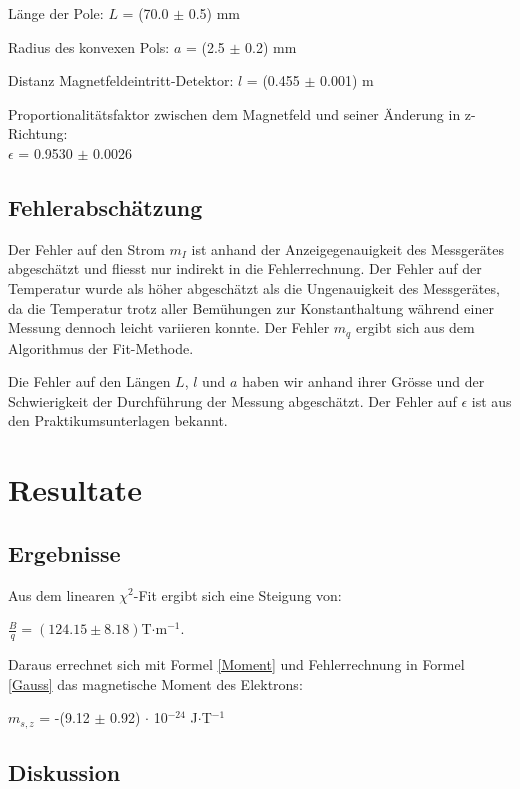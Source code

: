 \documentclass[a4paper,parskip,11pt, DIV12]{scrreprt}
\begin{document}
Länge der Pole:
$L$ = (70.0 $\pm$ 0.5) mm

Radius des konvexen Pols:
$a$ = (2.5 $\pm$ 0.2) mm

Distanz Magnetfeldeintritt-Detektor:
$l$ = (0.455 $\pm$ 0.001) m

Proportionalitätsfaktor zwischen dem Magnetfeld und seiner Änderung in z-Richtung:\\
$\epsilon$ = 0.9530 $\pm$ 0.0026


\section{Fehlerabschätzung}
Der Fehler auf den Strom $m_I$ ist anhand der Anzeigegenauigkeit des Messgerätes abgeschätzt und fliesst nur indirekt in die Fehlerrechnung. Der Fehler auf der Temperatur wurde als höher abgeschätzt als die Ungenauigkeit des Messgerätes, da die Temperatur trotz aller Bemühungen zur Konstanthaltung während einer Messung dennoch leicht variieren konnte. Der Fehler $m_q$ ergibt sich aus dem Algorithmus der Fit-Methode.

Die Fehler auf den Längen $L$, $l$ und $a$ haben wir anhand ihrer Grösse und der Schwierigkeit der Durchführung der Messung abgeschätzt. Der Fehler auf $\epsilon$ ist aus den Praktikumsunterlagen bekannt.
\clearpage

\chapter{Resultate}

\section{Ergebnisse}

Aus dem linearen $\chi^2$-Fit ergibt sich eine Steigung von:

$\frac{B}{q} = (124.15 \pm 8.18) $T$ \cdot $m$^{-1}$.

Daraus errechnet sich mit Formel \ref{Moment} und Fehlerrechnung in Formel \ref{Gauss} das magnetische Moment des Elektrons:
\begin{center}
\begin{large}
$m_{s,z}$ = -(9.12 $\pm$ 0.92) $\cdot$ 10$^{-24}$ J$\cdot$T$^{-1}$
\end{large}
\end{center}



\section{Diskussion}
\end{document}
